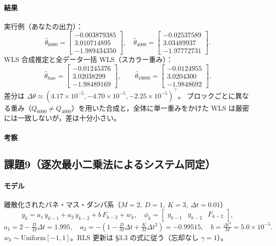 \paragraph{結果}
実行例（あなたの出力）：
\[
\hat\theta_{6000}=\begin{bmatrix}
-0.003879385\\ 3.010714895\\ -1.989434350
\end{bmatrix},\quad
\hat\theta_{4000}=\begin{bmatrix}
-0.02537589\\ 3.03489937\\ -1.97772731
\end{bmatrix}.
\]
WLS 合成推定と全データ一括 WLS（スカラー重み）：
\[
\hat\theta_{\mathrm{fuse}}=\begin{bmatrix}
-0.01245376\\ 3.02038299\\ -1.98489169
\end{bmatrix},\qquad
\hat\theta_{10000}=\begin{bmatrix}
-0.0124955\\ 3.0204300\\ -1.9848692
\end{bmatrix}.
\]
差分は
$\Delta\theta\approx(4.17\times10^{-5},-4.70\times10^{-5},-2.25\times10^{-5})^\top$。
ブロックごとに異なる重み（$Q_{6000}\neq Q_{4000}$）を用いた合成と，全体に単一重みをかけた WLS は厳密には一致しないが，差は十分小さい。\cite{exp2025}

\paragraph{考察}



\subsection{課題9（逐次最小二乗法によるシステム同定）}

\paragraph{モデル}
離散化されたバネ・マス・ダンパ系（$M=2,\ D=1,\ K=3,\ \Delta t=0.01$）
\[
y_k
= a_1\,y_{k-1}+a_2\,y_{k-2}+b\,F_{k-2}+w_k,\quad
\phi_k=\begin{bmatrix} y_{k-1}&y_{k-2}&F_{k-2}\end{bmatrix},
\]
\[
a_1=2-\tfrac{D}{M}\Delta t=1.995,\quad
a_2=-(1-\tfrac{D}{M}\Delta t+\tfrac{K}{M}\Delta t^2)=-0.99515,\quad
b=\tfrac{\Delta t^2}{M}=5.0\times10^{-5}.
\]
$w_k\sim\mathrm{Uniform}[-1,1]$。RLS 更新は \S3.3 の式に従う（忘却なし $\gamma=1$）\cite{exp2025}。

